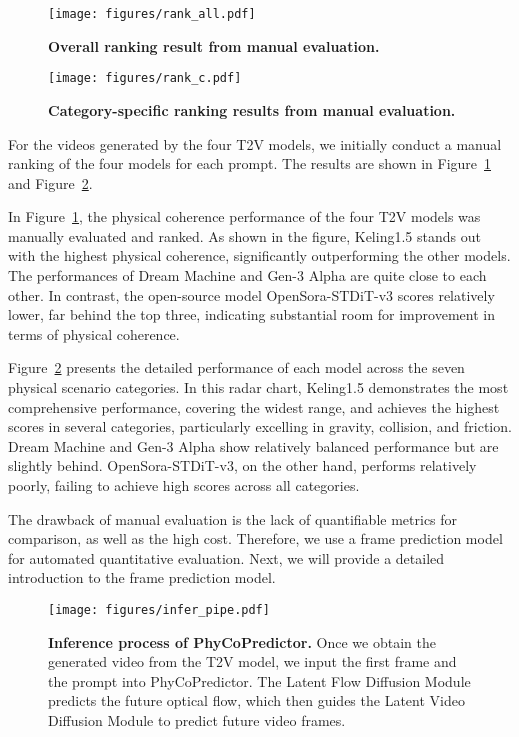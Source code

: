 \begin{figure}[ht]
\centering
\texttt{[image: figures/rank\_all.pdf]}
\caption{\textbf{Overall ranking result from manual evaluation.}}
\label{fig:rank_all}
\end{figure}

\begin{figure}[ht]
\centering
\texttt{[image: figures/rank\_c.pdf]}
\caption{\textbf{Category-specific ranking results from manual evaluation.}}
\label{fig:rank_c}
\end{figure}


For the videos generated by the four T2V models, we initially conduct a manual ranking of the four models for each prompt. The results are shown in Figure~\ref{fig:rank_all} and Figure~\ref{fig:rank_c}. 

In Figure~\ref{fig:rank_all}, the physical coherence performance of the four T2V models was manually evaluated and ranked. As shown in the figure, Keling1.5 stands out with the highest physical coherence, significantly outperforming the other models. The performances of Dream Machine and Gen-3 Alpha are quite close to each other. In contrast, the open-source model OpenSora-STDiT-v3 scores relatively lower, far behind the top three, indicating substantial room for improvement in terms of physical coherence.

Figure~\ref{fig:rank_c} presents the detailed performance of each model across the seven physical scenario categories. In this radar chart, Keling1.5 demonstrates the most comprehensive performance, covering the widest range, and achieves the highest scores in several categories, particularly excelling in gravity, collision, and friction. Dream Machine and Gen-3 Alpha show relatively balanced performance but are slightly behind. OpenSora-STDiT-v3, on the other hand, performs relatively poorly, failing to achieve high scores across all categories.

The drawback of manual evaluation is the lack of quantifiable metrics for comparison, as well as the high cost. Therefore, we use a frame prediction model for automated quantitative evaluation. Next, we will provide a detailed introduction to the frame prediction model.

\begin{figure*}[t]
  \centering
  \vspace{-1pt}
   \texttt{[image: figures/infer\_pipe.pdf]}
   \vspace{-5pt}
   \caption{
   \textbf{Inference process of PhyCoPredictor.} Once we obtain the generated video from the T2V model, we input the first frame and the prompt into PhyCoPredictor. The Latent Flow Diffusion Module predicts the future optical flow, which then guides the Latent Video Diffusion Module to predict future video frames.}
   \label{fig:infer_pipe}
   \vspace{-1pt}
\end{figure*}